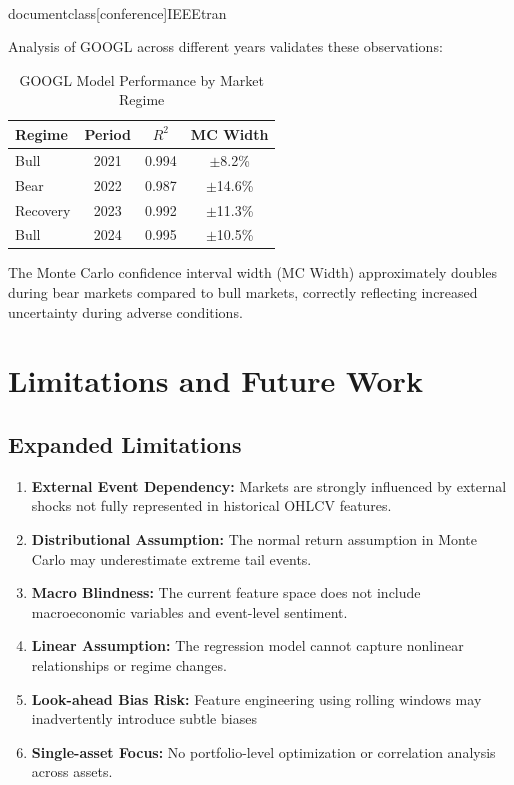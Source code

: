 \\documentclass[conference]{IEEEtran}
\begin{document}
Analysis of GOOGL across different years validates these observations:

\begin{table}[H]
\caption{GOOGL Model Performance by Market Regime}
\begin{center}
\begin{tabular}{|l|c|c|c|}
\hline
\textbf{Regime} & \textbf{Period} & \textbf{$R^2$} & \textbf{MC Width} \\
\hline
Bull & 2021 & 0.994 & $\pm$8.2\% \\
\hline
Bear & 2022 & 0.987 & $\pm$14.6\% \\
\hline
Recovery & 2023 & 0.992 & $\pm$11.3\% \\
\hline
Bull & 2024 & 0.995 & $\pm$10.5\% \\
\hline
\end{tabular}
\label{tab:googl_regime_performance}
\end{center}
\end{table}

The Monte Carlo confidence interval width (MC Width) approximately doubles during bear markets compared to bull markets, correctly reflecting increased uncertainty during adverse conditions.

\section{Limitations and Future Work}

\subsection{Expanded Limitations}
\begin{enumerate}
    \item \textbf{External Event Dependency:} Markets are strongly influenced by external shocks not fully represented in historical OHLCV features.
    \item \textbf{Distributional Assumption:} The normal return assumption in Monte Carlo may underestimate extreme tail events.
    \item \textbf{Macro Blindness:} The current feature space does not include macroeconomic variables and event-level sentiment.
    \item \textbf{Linear Assumption:} The regression model cannot capture nonlinear relationships or regime changes.
    \item \textbf{Look-ahead Bias Risk:} Feature engineering using rolling windows may inadvertently introduce subtle biases
    \item \textbf{Single-asset Focus:} No portfolio-level optimization or correlation analysis across assets.
\end{enumerate}
\end{document}
